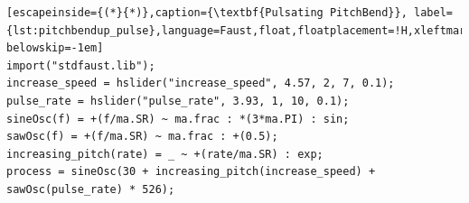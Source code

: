 \documentclass[runningheads]{llncs}
\begin{document}
\begin{lstlisting}[escapeinside={(*}{*)},caption={\textbf{Pulsating PitchBend}}, label={lst:pitchbendup_pulse},language=Faust,float,floatplacement=!H,xleftmargin=1em,xrightmargin=0.5em,firstnumber=0,aboveskip=0em, belowskip=-1em]
import("stdfaust.lib");
increase_speed = hslider("increase_speed", 4.57, 2, 7, 0.1);
pulse_rate = hslider("pulse_rate", 3.93, 1, 10, 0.1);
sineOsc(f) = +(f/ma.SR) ~ ma.frac : *(3*ma.PI) : sin;
sawOsc(f) = +(f/ma.SR) ~ ma.frac : +(0.5);
increasing_pitch(rate) = _ ~ +(rate/ma.SR) : exp;
process = sineOsc(30 + increasing_pitch(increase_speed) + sawOsc(pulse_rate) * 526);
\end{lstlisting}





\end{document}
